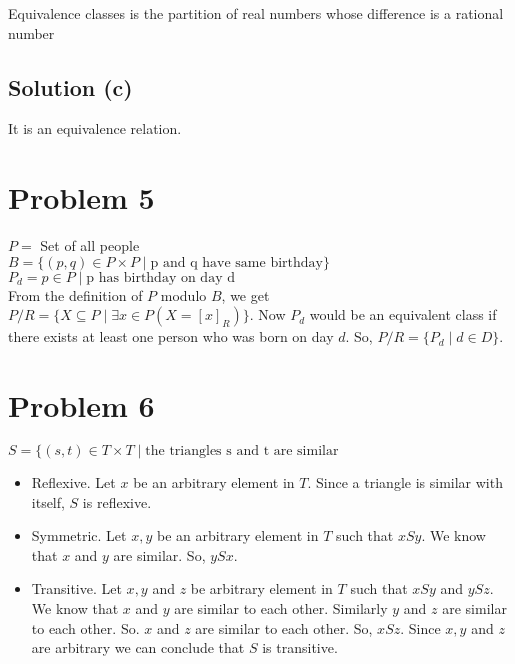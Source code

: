 \documentclass{article}
\begin{document}
Equivalence classes is the partition of real numbers whose difference
is a rational number

\subsection{Solution (c)}
It is an equivalence relation.

\section{Problem 5}
$P = $ Set of all people \\
$B = \{(p,q) \in P \times P \mid \text{p and q have same birthday}\}$ \\
$P_d = { p \in P \mid  \text{p has birthday on day d}}$ \\

From the definition of $P$ modulo $B$, we get $P/R = \{X \subseteq P
\mid \exists x \in P(X = [x]_R)\}$. Now $P_d$ would be an equivalent
class if there exists at least one person who was born on day $d$. So,
$P/R = \{P_d \mid d \in D\}$.

\section{Problem 6}
$S = \{(s,t) \in T \times T \mid \text{the triangles s and t are similar}$

\begin{itemize}
\item Reflexive. Let $x$ be an arbitrary element in $T$. Since a
  triangle is similar with itself, $S$ is reflexive.
\item Symmetric. Let $x,y$ be an arbitrary element in $T$ such that
  $xSy$. We know that $x$ and $y$ are similar. So, $ySx$.
\item Transitive. Let $x,y$ and $z$ be arbitrary element in $T$ such
  that $xSy$ and $ySz$. We know that $x$ and $y$ are similar to each
  other. Similarly $y$ and $z$ are similar to each other. So. $x$ and
  $z$ are similar to each other. So, $xSz$. Since $x,y$ and $z$ are
  arbitrary we can conclude that $S$ is transitive.
\end{itemize}
\end{document}
